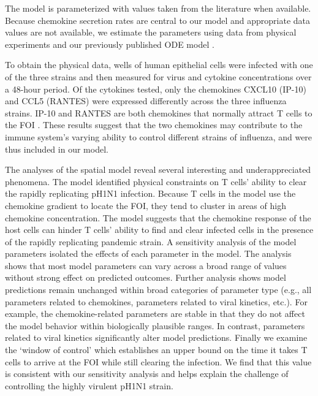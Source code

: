 \documentclass[preprint,10pt,numbers]{elsarticle}
\begin{document}
The model is parameterized with values taken from the literature when available.  Because chemokine secretion rates are central to our model and appropriate data values are not available, we estimate the parameters using data from physical experiments and our previously published ODE model \citep{Mitchell2011}.   

To obtain the physical data, wells of human epithelial cells were infected with one of the three strains and then measured for virus and cytokine concentrations over a 48-hour period.   Of the cytokines tested, only the chemokines CXCL10 (IP-10) and CCL5 (RANTES) were expressed differently across the three influenza strains.   IP-10 and RANTES are both chemokines that normally attract T cells to the FOI \citep{Hoji2005, Groom2011a}.  These results suggest that the two chemokines may contribute to the immune system's varying ability to control different strains of influenza, and were thus included in our model.

The analyses of the spatial model reveal several interesting and underappreciated phenomena.  The model identified physical constraints on T cells' ability to clear the rapidly replicating pH1N1 infection. Because T cells in the model use the chemokine gradient to locate the FOI, they tend to cluster in areas of high chemokine concentration. The model suggests that the chemokine response of the host cells can hinder T cells’ ability to find and clear infected cells in the presence of the rapidly replicating pandemic strain. A sensitivity analysis of the model parameters isolated the effects of each parameter in the model.  The analysis shows that most model parameters can vary across a broad range of values without strong effect on predicted outcomes.  Further analysis shows model predictions remain unchanged within broad categories of parameter type (e.g., all parameters related to chemokines, parameters related to viral kinetics, etc.).  For example, the chemokine-related parameters are stable in that they do not affect the model behavior within biologically plausible ranges. In contrast, parameters related to viral kinetics significantly alter model predictions.  Finally we examine the `window of control' which establishes an upper bound on the time it takes T cells to arrive at the FOI while still clearing the infection.  We find that this value is consistent with our sensitivity analysis and helps explain the challenge of controlling the highly virulent pH1N1 strain.



\end{document}
